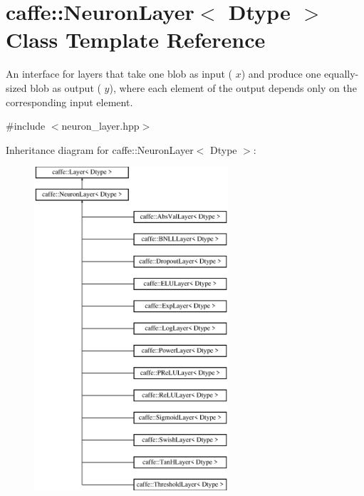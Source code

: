 \hypertarget{classcaffe_1_1NeuronLayer}{}\section{caffe\+:\+:Neuron\+Layer$<$ Dtype $>$ Class Template Reference}
\label{classcaffe_1_1NeuronLayer}


An interface for layers that take one blob as input ( $ x $) and produce one equally-\/sized blob as output ( $ y $), where each element of the output depends only on the corresponding input element.  




{\ttfamily \#include $<$neuron\+\_\+layer.\+hpp$>$}

Inheritance diagram for caffe\+:\+:Neuron\+Layer$<$ Dtype $>$\+:\begin{figure}[H]
\begin{center}
\leavevmode
\includegraphics[height=12.000000cm]{classcaffe_1_1NeuronLayer}
\end{center}
\end{figure}
